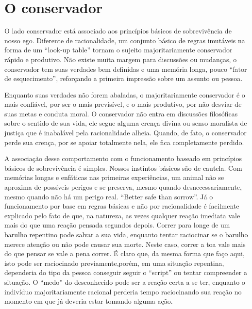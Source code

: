 \documentclass[14pt,portuguese]{extreport}
\begin{document}
    \section{O conservador}
    
      O lado conservador está associado aos princípios básicos de
      sobrevivência de nosso ego. Diferente de racionalidade, um conjunto
      básico de regras imutáveis na forma de um “look-up table” tornam o
      sujeito majoritariamente conservador rápido e produtivo. Não existe
      muita margem para discussões ou mudanças, o conservador tem suas
      verdades bem definidas e uma memória longa, pouco “fator de
      esquecimento”, reforçando a primeira impressão sobre um assunto ou
      pessoa.
      
      Enquanto suas verdades não forem abaladas, o majoritariamente
      conservador é o mais confiável, por ser o mais previsível, e o mais
      produtivo, por não desviar de suas metas e conduta moral. O
      conservador não entra em discussões filosóficas sobre o sentido de sua
      vida, ele segue alguma crença divina ou senso moralista de justiça que é
      inabalável pela racionalidade alheia. Quando, de fato, o conservador
      perde sua crença, por se apoiar totalmente nela, ele fica completamente
      perdido.
      
      A associação desse comportamento com o funcionamento baseado
      em princípios básicos de sobrevivência é simples. Nossos instintos
      básicos são de cautela. Com memórias longas e enfáticas nas primeiras
      experiências, um animal não se aproxima de possíveis perigos e se
      preserva, mesmo quando desnecessariamente, mesmo quando não há
      um perigo real. “Better safe than sorrow”. Já o funcionamento por base
      em regras básicas e não por racionalidade é facilmente explicado pelo
      fato de que, na natureza, as vezes qualquer reação imediata vale mais
      do que uma reação pensada segundos depois. Correr para longe de um
      barulho repentino pode salvar a sua vida, enquanto tentar raciocinar se
      o barulho merece atenção ou não pode causar sua morte. Neste caso,
      correr a toa vale mais do que pensar se vale a pena correr. É claro que,
      da mesma forma que faço aqui, isto pode ser raciocinado previamente,porém, em uma situação repentina, dependeria do tipo da pessoa
      conseguir seguir o “script” ou tentar compreender a situação. O “medo”
      do desconhecido pode ser a reação certa a se ter, enquanto o indivíduo
      majoritariamente racional perderia tempo raciocinando sua reação no
      momento em que já deveria estar tomando alguma ação.
      
\end{document}
